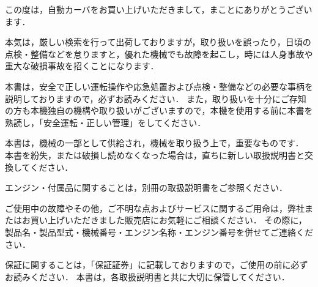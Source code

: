 %
%


\newpage
\null %
\thispagestyle{empty} %

\cleardoublepage %
\thispagestyle{empty} %
\setlength{\parindent}{1em}  %
\normalsize %

\vspace*{-3em}


この度は，自動カーバをお買い上げいただきまして，まことにありがとうございます．

本気は，厳しい検索を行って出荷しておりますが，取り扱いを誤ったり，日頃の点検・整備などを怠りますと，優れた機械でも故障を起こし，時には人身事故や重大な破損事故を招くことになります．

本書は，安全で正しい運転操作や応急処置および点検・整備などの必要な事柄を説明しておりますので，必ずお読みください．
また，取り扱いを十分にご存知の方も本機独自の機構や取り扱いがございますので，本機を使用する前に本書を熟読し，「安全運転・正しい管理」をしてください．

本書は，機械の一部として供給され，機械を取り扱う上で，重要なものです．
本書を紛失，または破損し読めなくなった場合は，直ちに新しい取扱説明書と交換してください．

エンジン・付属品に関することは，別冊の取扱説明書をご参照ください．





ご使用中の故障やその他，ご不明な点およびサービスに関するご用命は，弊社またはお買い上げいただきました販売店にお気軽にご相談ください．
その際に，製品名・製品型式・機械番号・エンジン名称・エンジン番号を併せてご連絡ください．

保証に関することは，「保証証券」に記載しておりますので，ご使用の前に必ずお読みください．
本書は，各取扱説明書と共に大切に保管してください．


\setlength{\parindent}{0pt}
